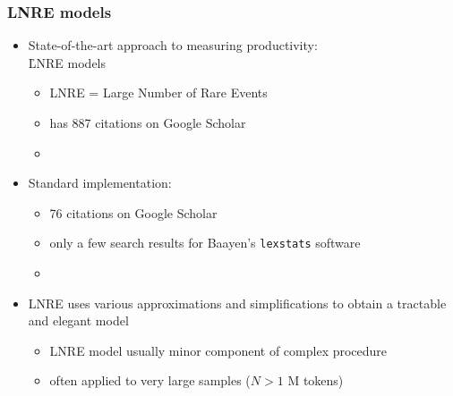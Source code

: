 \documentclass[handout,notes=show,t]{beamer} %
\begin{document}
\begin{frame}
  \frametitle{LNRE models}

  \begin{itemize}
  \item State-of-the-art approach to measuring productivity:\\
    \h{LNRE models} \citep{Baayen:01}
    \begin{itemize}
    \item LNRE = Large Number of Rare Events
    \item \citet{Baayen:01} has 887 citations on Google Scholar
    \item[]
    \end{itemize}
  \item Standard implementation:  \citep{Evert:Baroni:07}
    \begin{itemize}
    \item 76 citations on Google Scholar
    \item only a few search results for Baayen's \texttt{lexstats} software
    \item[]
    \end{itemize}
  \item LNRE uses various approximations and simplifications to obtain a tractable and elegant model
    \begin{itemize}
    \item LNRE model usually minor component of complex procedure
    \item often applied to very large samples ($N > 1$ M tokens)
    \end{itemize}
  \end{itemize}
\end{frame}
\end{document}
